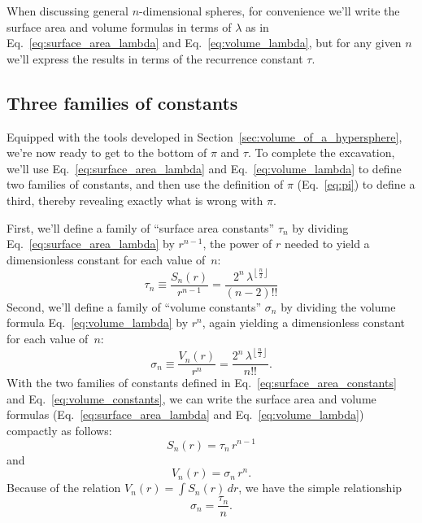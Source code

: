 When discussing general $n$-dimensional spheres, for convenience \linebreak we'll write the surface area and volume formulas in terms of $\lambda$ as in Eq.~\eqref{eq:surface_area_lambda} and Eq.~\eqref{eq:volume_lambda}, but for any given $n$ we'll express the results in terms of the recurrence constant $\tau$.




  \subsection{Three families of constants} %
  \label{sec:three_families_of_constants}

Equipped with the tools developed in Section~\ref{sec:volume_of_a_hypersphere}, we're now ready to get to the bottom of $\pi$ and $\tau$. To complete the excavation, we'll use Eq.~\eqref{eq:surface_area_lambda} and Eq.~\eqref{eq:volume_lambda} to define two families of constants, and then use the definition of $\pi$ (Eq.~\eqref{eq:pi}) to define a third, thereby revealing exactly what is wrong with $\pi$.

First, we'll define a family of ``surface area constants'' $\tau_n$ by dividing \linebreak Eq.~\eqref{eq:surface_area_lambda} by $r^{n-1}$, the power of $r$ needed to yield a dimensionless constant for each value of~$n$:
\begin{equation}
\label{eq:surface_area_constants}
\tau_n \equiv \frac{S_n(r)}{r^{n-1}} = \frac{2^n\,\lambda^{\left\lfloor \frac{n}{2} \right\rfloor}}{(n-2)!!}
\end{equation}
Second, we'll define a family of ``volume constants'' $\sigma_n$ by dividing the volume formula Eq.~\eqref{eq:volume_lambda} by $r^n$, again yielding a dimensionless constant for each value of~$n$:
\begin{equation}
\label{eq:volume_constants}
\sigma_n \equiv \frac{V_n(r)}{r^n} = \frac{2^n\,\lambda^{\left\lfloor \frac{n}{2} \right\rfloor}}{n!!}.
\end{equation}
With the two families of constants defined in Eq.~\eqref{eq:surface_area_constants} and Eq.~\eqref{eq:volume_constants}, we can write the surface area and volume formulas (Eq.~\eqref{eq:surface_area_lambda} and Eq.~\eqref{eq:volume_lambda}) compactly as follows:
\[ S_n(r) = \tau_n\,r^{n-1} \]
and
\[ V_n(r) = \sigma_n\,r^n. \]
Because of the relation $V_n(r) = \int S_n(r)\,dr$, we have the simple relationship
\[
\sigma_n = \frac{\tau_n}{n}.
\]


